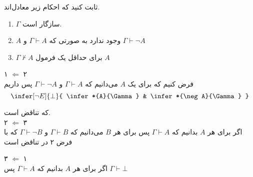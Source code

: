 
		ثابت کنید که احکام زیر معادل‌اند.
		 \begin{enumerate}
		 	\item $\Gamma$
		 	سازگار است.		
		 	\item
		 	$A$
		 	وجود ندارد به صورتی که 
		 	$\Gamma \vdash A$ 
		 	و
		 	$\Gamma \vdash \neg A$ 	
		 	
		 	\item $\Gamma \nvdash A$ 
		 	برای حداقل یک فرمول 
		 	$A$
		 	
		 \end{enumerate}
		 
	\quad\vspace {-0.5 cm}
	\begin{ans}
		۱ $\Leftarrow$ ۲ \\
		 فرض کنیم که برای یک $A$ می‌دانیم که
		 $\Gamma \vdash A$
		 و 
		 $\Gamma \vdash \neg A$
		 پس داریم
		 $$
		 	\infer[\neg E]{\bot}{
		 		\infer*{A}{\Gamma}
		 		&
		 		\infer*{\neg A}{\Gamma}
		 	}	
		 $$ 

که تناقض است.\\
		۲ $\Leftarrow$ ۳ \\
		اگر برای هر 
		$A$
		بدانیم که
		$\Gamma \vdash A$
		پس برای هر 
		$B$
		می‌دانیم که 
		$\Gamma \vdash B$ و
		$\Gamma \vdash \neg B$
		که با فرض ۲ در تناقض است
		
		۳ $\Leftarrow$ ۱ \\
		اگر برای هر 
		$A$
		بدانیم که
		$\Gamma \vdash A$
		پس 
		$\Gamma \vdash \bot$
		 
	\end{ans}
